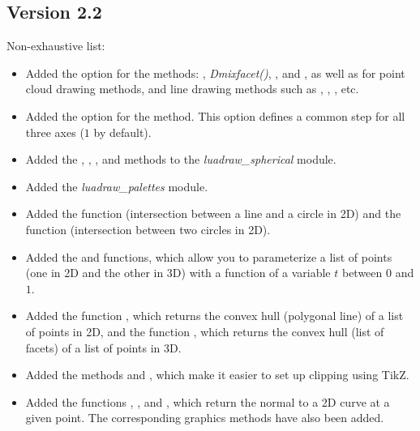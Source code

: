 \subsection{Version 2.2}
Non-exhaustive list:
\begin{itemize}
    \item Added the  option for the methods: , \emph{Dmixfacet()}, ,  and , as well as for point cloud drawing methods, and line drawing methods such as , , , etc.

    \item Added the  option for the  method. This option defines a common step for all three axes ($1$ by default).

     \item Added the , , , and  methods to the \emph{luadraw\_spherical} module.

    \item Added the \emph{luadraw\_palettes} module.

    \item Added the  function (intersection between a line and a circle in 2D) and the  function (intersection between two circles in 2D).

    \item Added the  and  functions, which allow you to parameterize a list of points (one in 2D and the other in 3D) with a function of a variable $t$ between $0$ and $1$.

    \item Added the function , which returns the convex hull (polygonal line) of a list of points in 2D, and the function , which returns the convex hull (list of facets) of a list of points in 3D.

    \item Added the methods  and , which make it easier to set up clipping using TikZ.

    \item Added the functions , , and , which return the normal to a 2D curve at a given point. The corresponding graphics methods have also been added.


\end{itemize}
